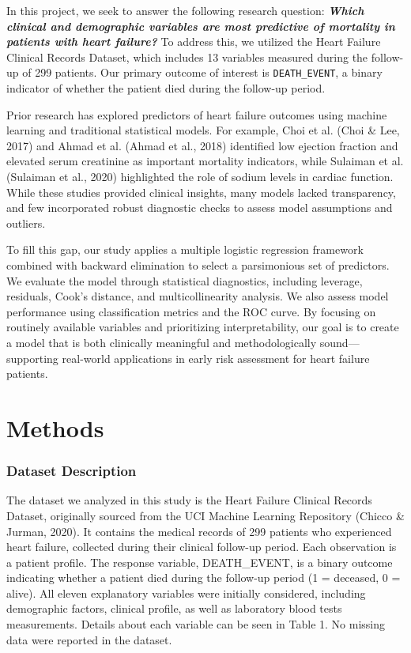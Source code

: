 \documentclass[
  letterpaper,
  DIV=11,
  numbers=noendperiod]{scrartcl}
\begin{document}
In this project, we seek to answer the following research question:
\textbf{\emph{Which clinical and demographic variables are most
predictive of mortality in patients with heart failure?}} To address
this, we utilized the Heart Failure Clinical Records Dataset, which
includes 13 variables measured during the follow-up of 299 patients. Our
primary outcome of interest is \texttt{DEATH\_EVENT}, a binary indicator
of whether the patient died during the follow-up period.

Prior research has explored predictors of heart failure outcomes using
machine learning and traditional statistical models. For example, Choi
et al. (Choi \& Lee, 2017) and Ahmad et al. (Ahmad et al., 2018)
identified low ejection fraction and elevated serum creatinine as
important mortality indicators, while Sulaiman et al. (Sulaiman et al.,
2020) highlighted the role of sodium levels in cardiac function. While
these studies provided clinical insights, many models lacked
transparency, and few incorporated robust diagnostic checks to assess
model assumptions and outliers.

To fill this gap, our study applies a multiple logistic regression
framework combined with backward elimination to select a parsimonious
set of predictors. We evaluate the model through statistical
diagnostics, including leverage, residuals, Cook's distance, and
multicollinearity analysis. We also assess model performance using
classification metrics and the ROC curve. By focusing on routinely
available variables and prioritizing interpretability, our goal is to
create a model that is both clinically meaningful and methodologically
sound---supporting real-world applications in early risk assessment for
heart failure patients.

\hypertarget{methods}{%
\section{Methods}\label{methods}}

\hypertarget{dataset-description}{%
\subsubsection{Dataset Description}\label{dataset-description}}

The dataset we analyzed in this study is the Heart Failure Clinical
Records Dataset, originally sourced from the UCI Machine Learning
Repository (Chicco \& Jurman, 2020). It contains the medical records of
299 patients who experienced heart failure, collected during their
clinical follow-up period. Each observation is a patient profile. The
response variable, DEATH\_EVENT, is a binary outcome indicating whether
a patient died during the follow-up period (1 = deceased, 0 = alive).
All eleven explanatory variables were initially considered, including
demographic factors, clinical profile, as well as laboratory blood tests
measurements. Details about each variable can be seen in Table 1. No
missing data were reported in the dataset.
\end{document}
